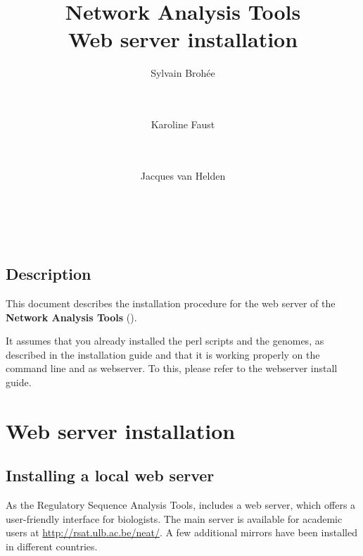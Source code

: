 \documentclass{book}
\begin{document}
\title{Network Analysis Tools \\
Web server installation}

\author{
	Sylvain Broh\'ee \\
	 \\
        \and \\
	Karoline Faust \\
	 \\
        \and \\
	Jacques van Helden \\
	\\
        \\
        \\
        \bigre
}


\maketitle

\newpage
\tableofcontents
\newpage

\section*{Description}

This document describes the installation procedure for the web server
of the \textbf{Network Analysis Tools} (\neat).

It assumes that you already installed the perl scripts and the
genomes, as described in the \RSAT installation guide and that it is 
working properly on the command line and as webserver. To this, please refer to the \RSAT webserver install guide.

\chapter{Web server installation}
\section{Installing a local web server}

As the Regulatory Sequence Analysis Tools, \neat includes a web server, which
offers a user-friendly interface for biologists. The main server is
available for academic users at \url{http://rsat.ulb.ac.be/neat/}. A
few additional mirrors have been installed in different countries.
\end{document}
